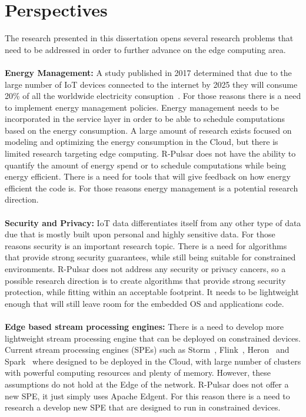 \section{Perspectives}
The research presented in this dissertation opens several research problems that need to be addressed in order to further advance on the edge computing area.
\\\\
\textbf{Energy Management:} A study published in 2017 determined that due to the large number of IoT devices connected to the internet by 2025 they will consume 20\% of all the worldwide electricity consuption~\cite{Energy}. For those reasons there is a need to implement energy management policies.  Energy management needs to be incorporated in the service layer in order to be able to schedule computations based on the energy consumption. A large amount of research exists focused on modeling and optimizing the energy consumption in the Cloud, but there is limited research targeting edge computing.  R-Pulsar does not have the ability to quantify the amount of energy spend or to schedule computations while being energy efficient. There is a need for tools that will give feedback on how energy efficient the code is. For those reasons energy management is a potential research direction.
\\\\
\textbf{Security and Privacy:} IoT data differentiates itself from any other type of data due that is mostly built upon personal and highly sensitive data. For those reasons security is an important research topic. There is a need for algorithms that provide strong security guarantees, while still being suitable for constrained environments. R-Pulsar does not address any security or privacy cancers, so a possible research direction is to create algorithms that provide strong security protection, while fitting within an acceptable footprint. It needs to be lightweight enough that will still leave room for the embedded OS and applications code. 
\\\\
\textbf{Edge based stream processing engines:} There is a need to develop more lightweight stream processing engine that can be deployed on constrained devices. Current stream processing engines (SPEs) such as Storm~\cite{storm}, Flink~\cite{flink}, Heron~\cite{heron} and Spark~\cite{spark} where designed to be deployed in the Cloud, with large number of clusters with powerful computing resources and plenty of memory. However, these assumptions do not hold at the Edge of the network. R-Pulsar does not offer a new SPE, it just simply uses Apache Edgent. For this reason there is a need to research a develop new SPE that are designed to run in constrained devices.

